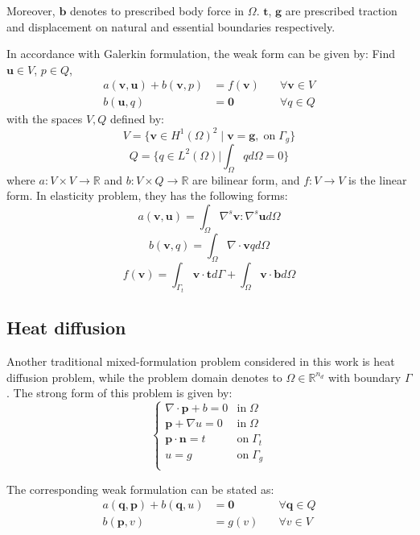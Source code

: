 Moreover, $\boldsymbol b$ denotes to prescribed body force in $\Omega$. $\boldsymbol t$, $\boldsymbol g$ are prescribed traction and displacement on natural and essential boundaries respectively. 

In accordance with Galerkin formulation, the weak form can be given by: 
Find $\boldsymbol u \in V$, $p \in Q$,
\begin{equation}
\begin{aligned}
    a(\boldsymbol v, \boldsymbol u) + b(\boldsymbol v, p) &= f(\boldsymbol v) \quad &\forall \boldsymbol v \in V \\
    b(\boldsymbol u, q) &= \boldsymbol 0 \quad &\forall q \in Q
\end{aligned}
\end{equation}
with the spaces $V, Q$ defined by:
\begin{equation}
V=\{\boldsymbol v \in H^1(\Omega)^2\;\vert\;\boldsymbol v = \boldsymbol g, \; \textrm{on} \; \Gamma_g\}
\end{equation}
\begin{equation}
Q = \{q \in L^2(\Omega) \vert \int_{\Omega} q d\Omega = 0\}
\end{equation}
where $a:V\times V\rightarrow \mathbb R$ and $b:V\times Q\rightarrow \mathbb R$ are bilinear form, and $f:V\rightarrow V$ is the linear form. In elasticity problem, they has the following forms:
\begin{equation}
    a(\boldsymbol v, \boldsymbol u) = \int_\Omega \nabla^s \boldsymbol v : \nabla^s \boldsymbol u d\Omega
\end{equation}
\begin{equation}
    b(\boldsymbol v, q) = \int_\Omega \nabla \cdot \boldsymbol v q d\Omega
\end{equation}
\begin{equation}
    f(\boldsymbol v) = \int_{\Gamma_t} \boldsymbol v \cdot \boldsymbol t d\Gamma + \int_{\Omega} \boldsymbol v \cdot \boldsymbol b d\Omega
\end{equation}

\subsection{Heat diffusion}
Another traditional mixed-formulation problem considered in this work is heat diffusion problem, while the problem domain denotes to $\Omega \in \mathbb R^{n_d}$ with boundary $\Gamma$. The strong form of this problem is given by:
\begin{equation}\label{strong_heat}
\begin{cases}
    \nabla \cdot \boldsymbol p + b = 0 & \mathrm{in} \; \Omega \\
    \boldsymbol p + \nabla u = 0 & \mathrm{in} \; \Omega \\
    \boldsymbol p \cdot \boldsymbol n = t & \mathrm{on} \; \Gamma_t \\
    u = g & \mathrm{on} \; \Gamma_g \\
\end{cases}
\end{equation}

The corresponding weak formulation can be stated as:
\begin{equation}
\begin{aligned}
    a(\boldsymbol q, \boldsymbol p) + b(\boldsymbol q, u) &= \boldsymbol 0 \quad &\forall \boldsymbol q \in Q \\
    b(\boldsymbol p, v) &= g(v) \quad &\forall v \in V
\end{aligned}
\end{equation}
